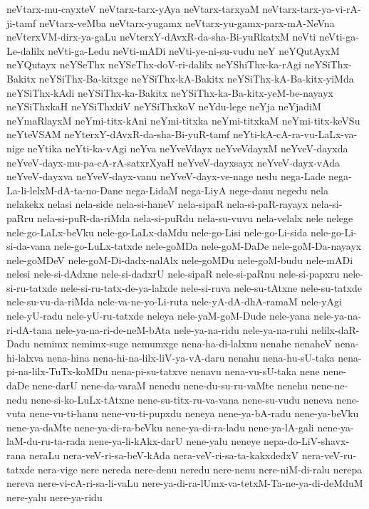 {neVtarx-mu-cayxteV
neVtarx-tarx-yAya
neVtarx-tarxyaM
neVtarx-tarx-ya-vi-rA-ji-tamf
neVtarx-veMba
neVtarx-yugamx
neVtarx-yu-gamx-parx-mA-NeVna
neVterxVM-dirx-ya-gaLu
neVterxY-dAvxR-da-sha-Bi-yuRkatxM
neVti
neVti-ga-Le-dalilx
neVti-ga-Ledu
neVti-mADi
neVti-ye-ni-su-vudu
neY
neYQutAyxM
neYQutayx
neYSeThx
neYSeThx-doV-ri-dalilx
neYShiThx-ka-rAgi
neYSiThx-Bakitx
neYSiThx-Ba-kitxge
neYSiThx-kA-Bakitx
neYSiThx-kA-Ba-kitx-yiMda
neYSiThx-kAdi
neYSiThx-ka-Bakitx
neYSiThx-ka-Ba-kitx-yeM-be-nayayx
neYSiThxkaH
neYSiThxkiV
neYSiThxkoV
neYdu-lege
neYja
neYjadiM
neYmaRlayxM
neYmi-titx-kAni
neYmi-titxka
neYmi-titxkaM
neYmi-titx-keVSu
neYteVSAM
neYterxY-dAvxR-da-sha-Bi-yuR-tamf
neYti-kA-cA-ra-vu-LaLx-va-nige
neYtika
neYti-ka-vAgi
neYva
neYveVdayx
neYveVdayxM
neYveV-dayxda
neYveV-dayx-mu-pa-cA-rA-satxrXyaH
neYveV-dayxsayx
neYveV-dayx-vAda
neYveV-dayxva
neYveV-dayx-vanu
neYveV-dayx-ve-nage
nedu
nega-Lade
nega-La-li-lelxM-dA-ta-no-Dane
nega-LidaM
nega-LiyA
nege-danu
negedu
nela
nelakekx
nelasi
nela-side
nela-si-haneV
nela-sipaR
nela-si-paR-rayayx
nela-si-paRru
nela-si-puR-da-riMda
nela-si-puRdu
nela-su-vuvu
nela-velalx
nele
nelege
nele-go-LaLx-beVku
nele-go-LaLx-daMdu
nele-go-Lisi
nele-go-Li-sida
nele-go-Li-si-da-vana
nele-go-LuLx-tatxde
nele-goMDa
nele-goM-DaDe
nele-goM-Da-nayayx
nele-goMDeV
nele-goM-Di-dadx-nalAlx
nele-goMDu
nele-goM-budu
nele-mADi
nelesi
nele-si-dAdxne
nele-si-dadxrU
nele-sipaR
nele-si-paRnu
nele-si-papxru
nele-si-ru-tatxde
nele-si-ru-tatx-de-ya-lalxde
nele-si-ruva
nele-su-tAtxne
nele-su-tatxde
nele-su-vu-da-riMda
nele-va-ne-yo-Li-ruta
nele-yA-dA-dhA-ramaM
nele-yAgi
nele-yU-radu
nele-yU-ru-tatxde
neleya
nele-yaM-goM-Dude
nele-yana
nele-ya-na-ri-dA-tana
nele-ya-na-ri-de-neM-bAta
nele-ya-na-ridu
nele-ya-na-ruhi
nelilx-daR-Dadu
nemimx
nemimx-suge
nemumxge
nena-ha-di-lalxnu
nenahe
nenaheV
nena-hi-lalxva
nena-hina
nena-hi-na-lilx-liV-ya-vA-daru
nenahu
nena-hu-sU-taka
nena-pi-na-lilx-TuTx-koMDu
nena-pi-su-tatxve
nenavu
nena-vu-sU-taka
nene
nene-daDe
nene-darU
nene-da-varaM
nenedu
nene-du-su-ru-vaMte
nenehu
nene-ne-nedu
nene-si-ko-LuLx-tAtxne
nene-su-titx-ru-va-vana
nene-su-vudu
neneva
nene-vuta
nene-vu-ti-hanu
nene-vu-ti-pupxdu
neneya
nene-ya-bA-radu
nene-ya-beVku
nene-ya-daMte
nene-ya-di-ra-beVku
nene-ya-di-ra-ladu
nene-ya-lA-gali
nene-ya-laM-du-ru-ta-rada
nene-ya-li-kAkx-darU
nene-yalu
neneye
nepa-do-LiV-shavx-rana
neraLu
nera-veV-ri-sa-beV-kAda
nera-veV-ri-sa-ta-kakxdedxV
nera-veV-ru-tatxde
nera-vige
nere
nereda
nere-denu
neredu
nere-nenu
nere-niM-di-ralu
nerepa
nereva
nere-vi-cA-ri-sa-li-vaLu
nere-ya-di-ra-lUmx-va-tetxM-Ta-ne-ya-di-deMduM
nere-yalu
nere-ya-ridu
}
